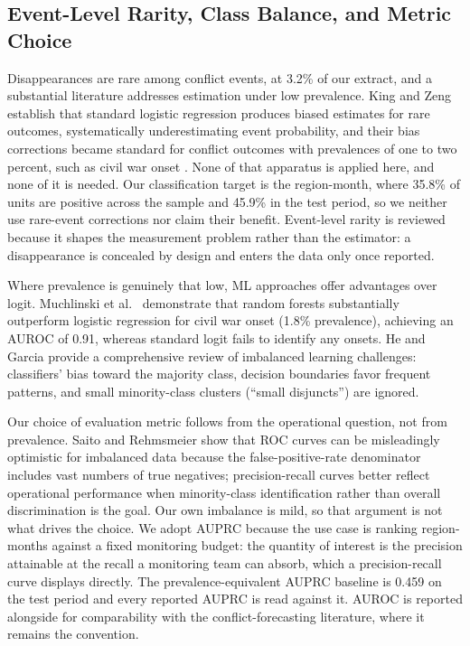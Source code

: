 \documentclass[pdflatex,sn-mathphys-num]{sn-jnl}%
\theoremstyle{thmstyleone}%
\theoremstyle{thmstyletwo}%
\theoremstyle{thmstylethree}%
\begin{document}
\subsection{Event-Level Rarity, Class Balance, and Metric Choice}

Disappearances are rare among conflict events, at 3.2\% of our extract, and a substantial literature addresses estimation under low prevalence. King and Zeng \cite{king2001logistic, king2001explaining} establish that standard logistic regression produces biased estimates for rare outcomes, systematically underestimating event probability, and their bias corrections became standard for conflict outcomes with prevalences of one to two percent, such as civil war onset \cite{ward2010perils}. None of that apparatus is applied here, and none of it is needed. Our classification target is the region-month, where 35.8\% of units are positive across the sample and 45.9\% in the test period, so we neither use rare-event corrections nor claim their benefit. Event-level rarity is reviewed because it shapes the measurement problem rather than the estimator: a disappearance is concealed by design and enters the data only once reported.

Where prevalence is genuinely that low, ML approaches offer advantages over logit. Muchlinski et al.~\cite{muchlinski2016comparing} demonstrate that random forests substantially outperform logistic regression for civil war onset (1.8\% prevalence), achieving an AUROC of 0.91, whereas standard logit fails to identify any onsets. He and Garcia \cite{he2009learning} provide a comprehensive review of imbalanced learning challenges: classifiers' bias toward the majority class, decision boundaries favor frequent patterns, and small minority-class clusters (``small disjuncts'') are ignored.

Our choice of evaluation metric follows from the operational question, not from prevalence. Saito and Rehmsmeier \cite{saito2015precision} show that ROC curves can be misleadingly optimistic for imbalanced data because the false-positive-rate denominator includes vast numbers of true negatives; precision-recall curves better reflect operational performance when minority-class identification rather than overall discrimination is the goal. Our own imbalance is mild, so that argument is not what drives the choice. We adopt AUPRC because the use case is ranking region-months against a fixed monitoring budget: the quantity of interest is the precision attainable at the recall a monitoring team can absorb, which a precision-recall curve displays directly. The prevalence-equivalent AUPRC baseline is 0.459 on the test period and every reported AUPRC is read against it. AUROC is reported alongside for comparability with the conflict-forecasting literature, where it remains the convention.
\end{document}
